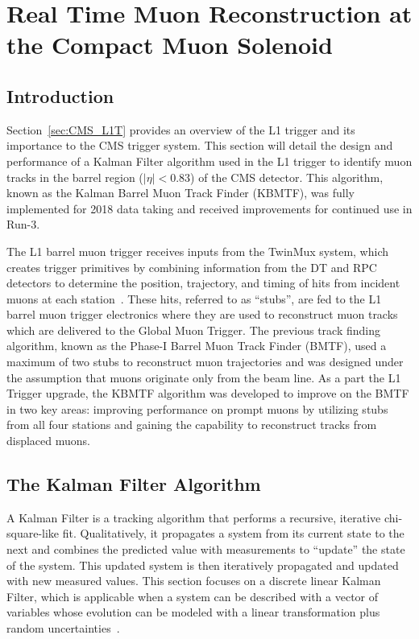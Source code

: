 
\chapter{Real Time Muon Reconstruction at the Compact Muon Solenoid}
\label{chap:kbmtf}

\section{Introduction} \label{sec:kbmtf_intro}
Section~\ref{sec:CMS_L1T} provides an overview of the L1 trigger and its importance to the CMS trigger system. This section will detail the design and performance of a Kalman Filter algorithm used in the L1 trigger to identify muon tracks in the barrel region ($|\eta|<0.83$) of the CMS detector. This algorithm, known as the Kalman Barrel Muon Track Finder (KBMTF), was fully implemented for 2018 data taking and received improvements for continued use in Run-3.

The L1 barrel muon trigger receives inputs from the TwinMux system, which creates trigger primitives by combining information from the DT and RPC detectors to determine the position, trajectory, and timing of hits from incident muons at each station~\cite{Triossi_2017}. These hits, referred to as ``stubs'', are fed to the L1 barrel muon trigger electronics where they are used to reconstruct muon tracks which are delivered to the Global Muon Trigger. The previous track finding algorithm, known as the Phase-I Barrel Muon Track Finder (BMTF), used a maximum of two stubs to reconstruct muon trajectories and was designed under the assumption that muons originate only from the beam line. As a part the L1 Trigger upgrade, the KBMTF algorithm was developed to improve on the BMTF in two key areas: improving performance on prompt muons by utilizing stubs from all four stations and gaining the capability to reconstruct tracks from displaced muons.

\section{The Kalman Filter Algorithm} \label{sec:kalman_filter}
A Kalman Filter is a tracking algorithm that performs a recursive, iterative chi-square-like fit. Qualitatively, it propagates a system from its current state to the next and combines the predicted value with measurements to ``update'' the state of the system. This updated system is then iteratively propagated and updated with new measured values. This section focuses on a discrete linear Kalman Filter, which is applicable when a system can be described with a vector of variables whose evolution can be modeled with a linear transformation plus random uncertainties~\cite{FRUHWIRTH1987444}.

